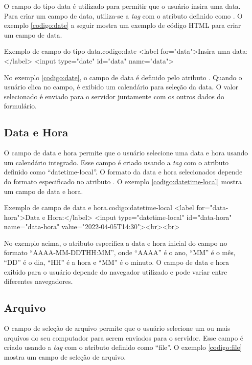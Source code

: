 O campo do tipo data é utilizado para permitir que o usuário insira uma data. Para criar um campo de data, utiliza-se a \textit{tag}  com o atributo  definido como . O exemplo \ref{codigo:date} a seguir mostra um exemplo de código HTML para criar um campo de data.

\begin{htmlcode}{Exemplo de campo do tipo data.}{codigo:date}
<label for="data">Insira uma data:</label>
<input type="date" id="data" name="data">
\end{htmlcode}

No exemplo \ref{codigo:date}, o campo de data é definido pelo atributo . Quando o usuário clica no campo, é exibido um calendário para seleção da data. O valor selecionado é enviado para o servidor juntamente com os outros dados do formulário.

\subsection{Data e Hora}

O campo de data e hora permite que o usuário selecione uma data e hora usando um calendário integrado. Esse campo é criado usando a \textit{tag}  com o atributo  definido como ``datetime-local''. O formato da data e hora selecionados depende do formato especificado no atributo . O exemplo \ref{codigo:datetime-local} mostra um campo de data e hora.

\begin{htmlcode}{Exemplo de campo de data e hora.}{codigo:datetime-local}
<label for="data-hora">Data e Hora:</label>
<input type="datetime-local" id="data-hora" name="data-hora" value="2022-04-05T14:30"><br><br>
\end{htmlcode}

No exemplo acima, o atributo  especifica a data e hora inicial do campo no formato ``AAAA-MM-DDTHH:MM'', onde ``AAAA'' é o ano, ``MM'' é o mês, ``DD'' é o dia, ``HH'' é a hora e ``MM'' é o minuto. O campo de data e hora exibido para o usuário depende do navegador utilizado e pode variar entre diferentes navegadores.

\subsection{Arquivo}

O campo de seleção de arquivo permite que o usuário selecione um ou mais arquivos do seu computador para serem enviados para o servidor. Esse campo é criado usando a \textit{tag}  com o atributo  definido como ``file''. O exemplo \ref{codigo:file} mostra um campo de seleção de arquivo.

